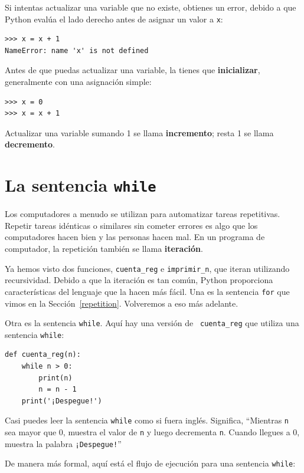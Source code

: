 \documentclass[10pt]{book}
\begin{document}
Si intentas actualizar una variable que no existe, obtienes un
error, debido a que Python evalúa el lado derecho antes de asignar
un valor a {\tt x}:

\begin{verbatim}
>>> x = x + 1
NameError: name 'x' is not defined
\end{verbatim}
%
Antes de que puedas actualizar una variable, la tienes que {\bf inicializar},
generalmente con una asignación simple:

\begin{verbatim}
>>> x = 0
>>> x = x + 1
\end{verbatim}
%
Actualizar una variable sumando 1 se llama {\bf incremento};
resta 1 se llama {\bf decremento}.




\section{La sentencia {\tt while}}

Los computadores a menudo se utilizan para automatizar tareas repetitivas.  Repetir
tareas idénticas o similares sin cometer errores es algo que
los computadores hacen bien y las personas hacen mal.  En un programa de computador,
la repetición también se llama {\bf iteración}.

Ya hemos visto dos funciones, {\tt cuenta\_reg} e
\verb"imprimir_n", que iteran utilizando recursividad.  Debido a que la iteración es tan
común, Python proporciona características del lenguaje que la hacen más fácil.
Una es la sentencia {\tt for} que vimos en la Sección~\ref{repetition}.
Volveremos a eso más adelante.

Otra es la sentencia {\tt while}.  Aquí hay una versión de {\tt
cuenta\_reg} que utiliza una sentencia {\tt while}:

\begin{verbatim}
def cuenta_reg(n):
    while n > 0:
        print(n)
        n = n - 1
    print('¡Despegue!')
\end{verbatim}
%
Casi puedes leer la sentencia {\tt while} como si fuera inglés.
Significa, ``Mientras {\tt n} sea mayor que 0,
muestra el valor de {\tt n} y luego decrementa
{\tt n}.  Cuando llegues a 0, muestra la palabra {\tt ¡Despegue!}''

De manera más formal, aquí está el flujo de ejecución para una sentencia {\tt while}:
\end{document}
